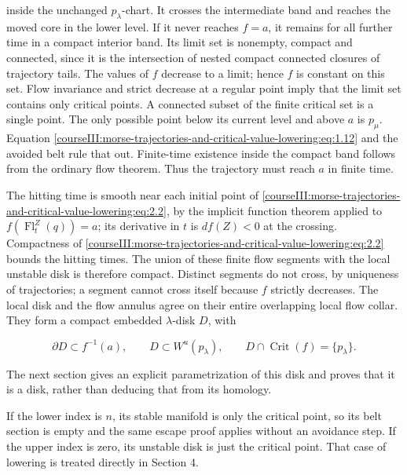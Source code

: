 inside the unchanged \(p_\lambda\)-chart. It crosses the intermediate band and reaches the moved core in the lower level. If it never reaches \(f=a\), it remains for all further time in a compact interior band. Its limit set is nonempty, compact and connected, since it is the intersection of nested compact connected closures of trajectory tails. The values of \(f\) decrease to a limit; hence \(f\) is constant on this set. Flow invariance and strict decrease at a regular point imply that the limit set contains only critical points. A connected subset of the finite critical set is a single point. The only possible point below its current level and above \(a\) is \(p_\mu\). Equation \eqref{courseIII:morse-trajectories-and-critical-value-lowering:eq:1.12} and the avoided belt rule that out. Finite-time existence inside the compact band follows from the ordinary flow theorem. Thus the trajectory must reach \(a\) in finite time.

The hitting time is smooth near each initial point of \eqref{courseIII:morse-trajectories-and-critical-value-lowering:eq:2.2}, by the implicit function theorem applied to
\(f(\operatorname{Fl}^{Z}_t(q))=a\); its derivative in \(t\) is \(df(Z)<0\) at the crossing. Compactness of \eqref{courseIII:morse-trajectories-and-critical-value-lowering:eq:2.2} bounds the hitting times. The union of these finite flow segments with the local unstable disk is therefore compact. Distinct segments do not cross, by uniqueness of trajectories; a segment cannot cross itself because \(f\) strictly decreases. The local disk and the flow annulus agree on their entire overlapping local flow collar. They form a compact embedded \(\lambda\)-disk \(D\), with

\begin{equation}
\partial D\subset f^{-1}(a),\qquad
 D\subset W^u(p_\lambda),\qquad
 D\cap\operatorname{Crit}(f)=\{p_\lambda\}.
 \label{courseIII:morse-trajectories-and-critical-value-lowering:eq:2.3}
\end{equation}

The next section gives an explicit parametrization of this disk and proves that it is a disk, rather than deducing that from its homology.

If the lower index is \(n\), its stable manifold is only the critical point, so its belt section is empty and the same escape proof applies without an avoidance step. If the upper index is zero, its unstable disk is just the critical point. That case of lowering is treated directly in Section 4.


